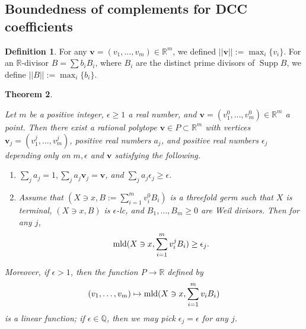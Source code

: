 \documentclass[11pt]{amsart}
\numberwithin{equation}{section}
\newcommand{\Qq}{\mathbb{Q}}
\newcommand{\Rr}{\mathbb{R}}
\newcommand{\mld}{{\rm{mld}}}
\newcommand{\Supp}{\operatorname{Supp}}
\newtheorem{thm}{Theorem}[section]
\theoremstyle{definition}
\theoremstyle{definition}
\newtheorem{defn}[thm]{Definition}
\begin{document}
\subsection{Boundedness of complements for DCC coefficients}

\begin{defn}\label{defn: definition of norm of divisor}
For any $\bm v=(v_1,\dots,v_m)\in \Rr^m$, we defined $||\bm v||:=\max_i\{v_i\}$. For an $\Rr$-divisor $B=\sum b_iB_i$, where $B_i$ are the distinct prime divisors of $\Supp B$, we define $||B||:=\max_i\{b_i\}$.
\end{defn}

\begin{thm}\label{thm: linearmld terminal threefold}

Let $m$ be a positive integer, $\epsilon\geq 1$ a real number,  and $\bm{v}=(v_1^0,\ldots,v_m^0)\in\Rr^m$ a point. Then there exist a rational polytope $\bm{v}\in P\subset\Rr^m$ with vertices $\bm{v}_j=(v_1^j,\ldots,v_m^j)$, positive real numbers $a_j$, and positive real numbers $\epsilon_j$ depending only on $m,\epsilon$ and $\bm{v}$ satisfying the following. 
	\begin{enumerate}
	 \item $\sum_{j} a_j=1,\sum_{j} a_j\bm{v}_j=\bm{v}$, and $\sum_{j} a_j\epsilon_j\ge\epsilon$.
	 \item Assume that $(X\ni x,B:=\sum_{i=1}^m v_i^0B_{i})$ is a threefold germ such that $X$ is terminal, $(X\ni x,B)$ is $\epsilon$-lc, and $B_1,\ldots,B_m\ge0$ are Weil divisors. Then for any $j$,
  	 $$\mld(X\ni x,\sum_{i=1}^m v_i^jB_{i})\ge \epsilon_j.$$
	\end{enumerate}
	Moreover, if $\epsilon>1$, then the function $P\to \Rr$ defined by
   	 $$(v_1,\ldots,v_m)\mapsto \mld(X\ni x,\sum_{i=1}^m v_iB_{i})$$
  	 is a linear function; if $\epsilon\in \Qq$, then we may pick $\epsilon_j=\epsilon$ for any $j$.
\end{thm}
\end{document}
